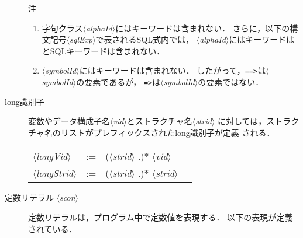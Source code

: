 \documentclass{jbook}
\newcommand{\nonterm}[1]{\mbox{$\langle$}{\it #1}\mbox{$\rangle$}}
\newcommand{\term}[1]{\mbox{{\tt #1}}}
\begin{document}
\begin{description}
注
\begin{enumerate}
\item 字句クラス\nonterm{alphaId}にはキーワードは含まれない．
	さらに，以下の構文記号\nonterm{sqlExp}で表されるSQL式内では，
\nonterm{alphaId}にはキーワードはとSQLキーワードは含まれない．
\item \nonterm{symbolId}にはキーワードは含まれない．
	したがって，\term{==>}は\nonterm{symbolId}の要素であるが，
\term{=>}は\nonterm{symbolId}の要素ではない．
\end{enumerate}

	
\item[long識別子]
\label{sec:lexicalItems:longid}
	変数やデータ構成子名\nonterm{vid}とストラクチャ名\nonterm{strid}
に対しては，ストラクチャ名のリストがプレフィックスされたlong識別子が定義
される．

\begin{center}
\begin{tabular}{lcll}
\nonterm{longVid} &:=& (\nonterm{strid} .)* \nonterm{vid}\\
\nonterm{longStrid} &:=& (\nonterm{strid} .)* \nonterm{strid}
\end{tabular}
\end{center}


\item[定数リテラル \nonterm{scon}] 
\label{sec:lexicalItems:constants}
	定数リテラルは，プログラム中で定数値を表現する．
	以下の表現が定義されている．


\end{description}
\end{document}
